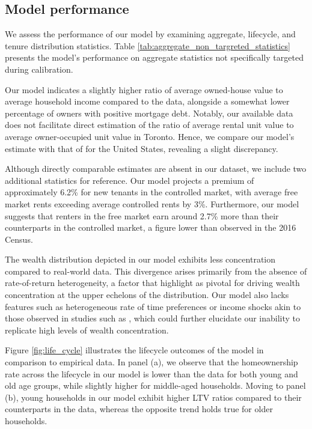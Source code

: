 \documentclass[parskip=full]{article}
\begin{document}
\subsection{Model performance}\label{subsection:non_targeted_statistics}

We assess the performance of our model by examining aggregate, lifecycle, and tenure distribution statistics. Table \ref{tab:aggregate_non_targreted_statistics} presents the model's performance on aggregate statistics not specifically targeted during calibration.

Our model indicates a slightly higher ratio of average owned-house value to average household income compared to the data, alongside a somewhat lower percentage of owners with positive mortgage debt. Notably, our available data does not facilitate direct estimation of the ratio of average rental unit value to average owner-occupied unit value in Toronto. Hence, we compare our model's estimate with that of \citet{chatterjee-eyigungor-2015} for the United States, revealing a slight discrepancy.

Although directly comparable estimates are absent in our dataset, we include two additional statistics for reference. Our model projects a premium of approximately 6.2\% for new tenants in the controlled market, with average free market rents exceeding average controlled rents by 3\%. Furthermore, our model suggests that renters in the free market earn around 2.7\% more than their counterparts in the controlled market, a figure lower than observed in the 2016 Census.

The wealth distribution depicted in our model exhibits less concentration compared to real-world data. This divergence arises primarily from the absence of rate-of-return heterogeneity, a factor that \citet{fagereng} highlight as pivotal for driving wealth concentration at the upper echelons of the distribution. Our model also lacks features such as heterogeneous rate of time preferences \citep{ks-1998} or income shocks akin to those observed in studies such as \citet{mj-shocks}, which could further elucidate our inability to replicate high levels of wealth concentration.

Figure \ref{fig:life_cycle} illustrates the lifecycle outcomes of the model in comparison to empirical data. In panel (a), we observe that the homeownership rate across the lifecycle in our model is lower than the data for both young and old age groups, while slightly higher for middle-aged households. Moving to panel (b), young households in our model exhibit higher LTV ratios compared to their counterparts in the data, whereas the opposite trend holds true for older households.
\end{document}
